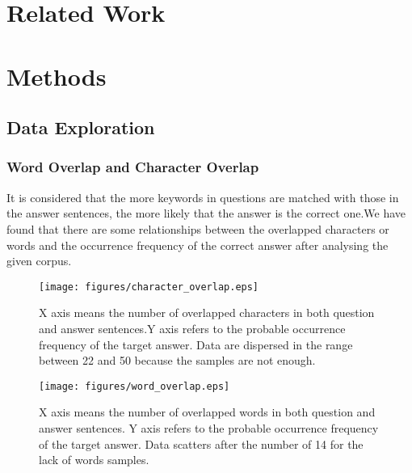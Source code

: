 \documentclass{llncs}
\begin{document}
\section{Related Work}

\section{Methods}


\subsection{Data Exploration}

\subsubsection{Word Overlap and Character Overlap}
It is considered that the more keywords in questions are matched with those in the answer sentences, the more likely that the answer is the correct one.We have found that there are some relationships between the overlapped characters or words and the occurrence frequency of the correct answer after analysing the given corpus.


\begin{figure}[htb]
\centering
\texttt{[image: figures/character\_overlap.eps]}
\caption{X axis means the number of overlapped characters in both question and answer sentences.Y axis refers to the probable occurrence frequency of the target answer. Data are dispersed in the range between 22 and 50 because the samples are not enough.}
\label{fig:character_overlap}
\end{figure}


\begin{figure}
\centering
\texttt{[image: figures/word\_overlap.eps]}
\caption{X axis means the number of overlapped words in both question and answer sentences. Y axis refers to the probable occurrence frequency of the target answer. Data scatters after the number of 14 for the lack of words samples.}
\label{fig:word_overlap}
\end{figure}
\end{document}
